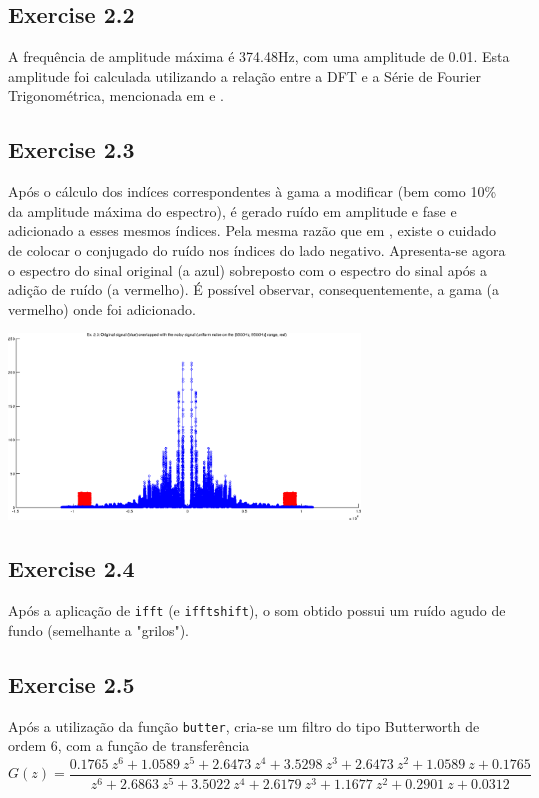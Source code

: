 \documentclass[a4paper]{article}
\begin{document}
\subsection{Exercise 2.2}
\noindent A frequência de amplitude máxima é 374.48Hz, com uma amplitude de 0.01. Esta amplitude foi calculada utilizando a relação entre a DFT e a Série de Fourier Trigonométrica, mencionada em \emph{} e \emph{}.

\clearpage

\subsection{Exercise 2.3}
\noindent Após o cálculo dos indíces correspondentes à gama a modificar (bem como 10\% da amplitude máxima do espectro), é gerado ruído em amplitude e fase e adicionado a esses mesmos índices. Pela mesma razão que em \emph{}, existe o cuidado de colocar o conjugado do ruído nos índices do lado negativo. Apresenta-se agora o espectro do sinal original (a azul) sobreposto com o espectro do sinal após a adição de ruído (a vermelho). É possível observar, consequentemente, a gama (a vermelho) onde foi adicionado.
\begin{center}
	\includegraphics[width=0.70\textwidth]{images/ex_2_3_lowpass.png}
	\label{fig:ex_2_3}
\end{center}

\subsection{Exercise 2.4}
\noindent Após a aplicação de \texttt{ifft} (e \texttt{ifftshift}), o som obtido possui um ruído agudo de fundo (semelhante a "grilos").

\subsection{Exercise 2.5}
\noindent Após a utilização da função \texttt{butter}, cria-se um filtro do tipo Butterworth de ordem 6, com a função de transferência
\begin{equation}
G(z) = \frac{0.1765~z^6 + 1.0589~z^5 + 2.6473~z^4 + 3.5298~z^3 + 2.6473~z^2 + 1.0589~z + 0.1765}{z^6 + 2.6863~z^5 + 3.5022~z^4 + 2.6179~z^3 + 1.1677~z^2 + 0.2901~z + 0.0312}
\end{equation}
\end{document}
